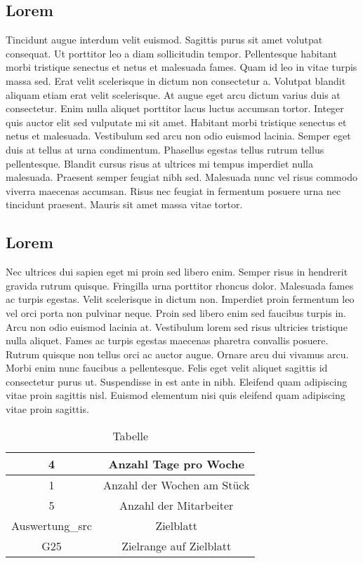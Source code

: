 \subsection{Lorem}
Tincidunt augue interdum velit euismod. Sagittis purus sit amet volutpat consequat. Ut porttitor leo a diam sollicitudin tempor. Pellentesque habitant morbi tristique senectus et netus et malesuada fames. Quam id leo in vitae turpis massa sed. Erat velit scelerisque in dictum non consectetur a. Volutpat blandit aliquam etiam erat velit scelerisque. At augue eget arcu dictum varius duis at consectetur. Enim nulla aliquet porttitor lacus luctus accumsan tortor. Integer quis auctor elit sed vulputate mi sit amet. Habitant morbi tristique senectus et netus et malesuada. Vestibulum sed arcu non odio euismod lacinia. Semper eget duis at tellus at urna condimentum. Phasellus egestas tellus rutrum tellus pellentesque. Blandit cursus risus at ultrices mi tempus imperdiet nulla malesuada. Praesent semper feugiat nibh sed. Malesuada nunc vel risus commodo viverra maecenas accumsan. Risus nec feugiat in fermentum posuere urna nec tincidunt praesent. Mauris sit amet massa vitae tortor.


\subsection{Lorem}
Nec ultrices dui sapien eget mi proin sed libero enim. Semper risus in hendrerit gravida rutrum quisque. Fringilla urna porttitor rhoncus dolor. Malesuada fames ac turpis egestas. Velit scelerisque in dictum non. Imperdiet proin fermentum leo vel orci porta non pulvinar neque. Proin sed libero enim sed faucibus turpis in. Arcu non odio euismod lacinia at. Vestibulum lorem sed risus ultricies tristique nulla aliquet. Fames ac turpis egestas maecenas pharetra convallis posuere. Rutrum quisque non tellus orci ac auctor augue. Ornare arcu dui vivamus arcu. Morbi enim nunc faucibus a pellentesque. Felis eget velit aliquet sagittis id consectetur purus ut. Suspendisse in est ante in nibh. Eleifend quam adipiscing vitae proin sagittis nisl. Euismod elementum nisi quis eleifend quam adipiscing vitae proin sagittis.
\begin{table}[h]
 \centering
 \begin{tabular}{|c|c|}\hline
   4 & Anzahl Tage pro Woche \\ \hline
   1 & Anzahl der Wochen am Stück \\ \hline
   5 & Anzahl der Mitarbeiter \\ \hline
   Auswertung\_src & Zielblatt \\ \hline
   G25 & Zielrange auf Zielblatt \\ \hline
 \end{tabular}
 \caption{Tabelle}\label{fig:tabelle}
\end{table}
\newpage

